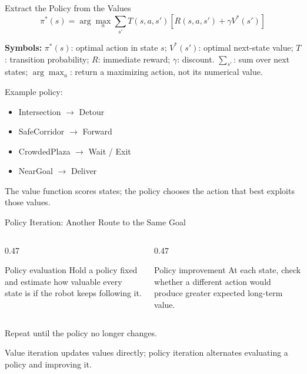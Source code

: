 \documentclass[aspectratio=169,10pt]{beamer}
\newcommand{\equationlegend}[1]{%
  \par\smallskip
  \begingroup
    \setlength{\fboxsep}{4pt}%
    \noindent\colorbox{DeckSoft}{%
      \parbox{\dimexpr\linewidth-2\fboxsep\relax}{%
        \footnotesize\textbf{Symbols:} #1%
      }%
    }\par
  \endgroup
  \smallskip
}
\begin{document}
\begin{frame}[shrink=10]{Extract the Policy from the Values}
  \[
    \pi^*(s)=\arg\max_a\sum_{s'}T(s,a,s')
    \left[R(s,a,s')+\gamma V^*(s')\right]
  \]
  \equationlegend{$\pi^*(s)$: optimal action in state $s$; $V^*(s')$: optimal next-state value; $T$: transition probability; $R$: immediate reward; $\gamma$: discount. $\sum_{s'}$: sum over next states; $\arg\max_a$: return a maximizing action, not its numerical value.}

  Example policy:
  \begin{itemize}
    \item Intersection $\rightarrow$ Detour
    \item SafeCorridor $\rightarrow$ Forward
    \item CrowdedPlaza $\rightarrow$ Wait / Exit
    \item NearGoal $\rightarrow$ Deliver
  \end{itemize}

  \begin{keyidea}
    The value function scores states; the policy chooses the action that best exploits those values.
  \end{keyidea}
\end{frame}

\begin{frame}[shrink=10]{Policy Iteration: Another Route to the Same Goal}
  \begin{columns}[T,onlytextwidth]
    \begin{column}{0.47\textwidth}
      \begin{block}{Policy evaluation}
        Hold a policy fixed and estimate how valuable every state is if the robot keeps following it.
      \end{block}
    \end{column}
    \begin{column}{0.47\textwidth}
      \begin{block}{Policy improvement}
        At each state, check whether a different action would produce greater expected long-term value.
      \end{block}
    \end{column}
  \end{columns}

  Repeat until the policy no longer changes.

  \begin{keyidea}
    Value iteration updates values directly; policy iteration alternates evaluating a policy and improving it.
  \end{keyidea}
\end{frame}
\end{document}
